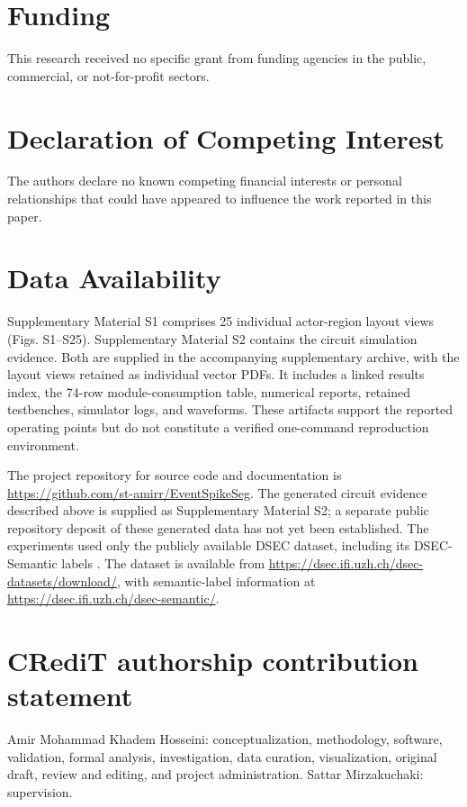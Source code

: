 \documentclass[preprint,12pt,number]{elsarticle}
\begin{document}
\section*{Funding}
This research received no specific grant from funding agencies in the public, commercial, or not-for-profit sectors.

\section*{Declaration of Competing Interest}
The authors declare no known competing financial interests or personal relationships that could have appeared to influence the work reported in this paper.

\section*{Data Availability}
Supplementary Material S1 comprises 25 individual actor-region layout views (Figs. S1--S25). Supplementary Material S2 contains the circuit simulation evidence. Both are supplied in the accompanying supplementary archive, with the layout views retained as individual vector PDFs. It includes a linked results index, the 74-row module-consumption table, numerical reports, retained testbenches, simulator logs, and waveforms. These artifacts support the reported operating points but do not constitute a verified one-command reproduction environment.

The project repository for source code and documentation is \url{https://github.com/st-amirr/EventSpikeSeg}. The generated circuit evidence described above is supplied as Supplementary Material S2; a separate public repository deposit of these generated data has not yet been established. The experiments used only the publicly available DSEC dataset, including its DSEC-Semantic labels \cite{gehrig2021dsec,sun2022ess}. The dataset is available from \url{https://dsec.ifi.uzh.ch/dsec-datasets/download/}, with semantic-label information at \url{https://dsec.ifi.uzh.ch/dsec-semantic/}.

\section*{CRediT authorship contribution statement}
Amir Mohammad Khadem Hosseini: conceptualization, methodology, software, validation, formal analysis, investigation, data curation, visualization, original draft, review and editing, and project administration. Sattar Mirzakuchaki: supervision.
\end{document}
